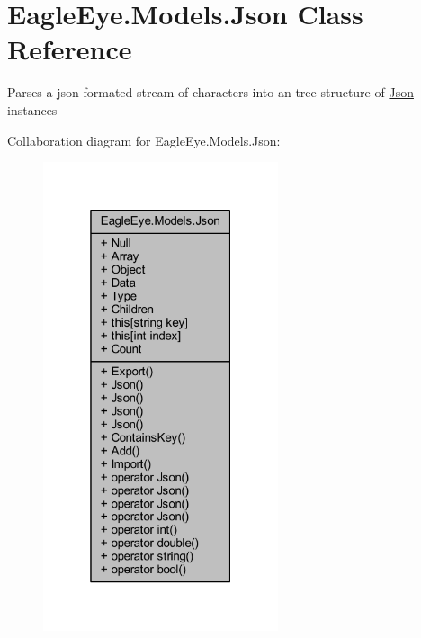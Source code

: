 \hypertarget{class_eagle_eye_1_1_models_1_1_json}{}\section{Eagle\+Eye.\+Models.\+Json Class Reference}
\label{class_eagle_eye_1_1_models_1_1_json}


Parses a json formated stream of characters into an tree structure of \mbox{\hyperlink{class_eagle_eye_1_1_models_1_1_json}{Json}} instances  




Collaboration diagram for Eagle\+Eye.\+Models.\+Json\+:\nopagebreak
\begin{figure}[H]
\begin{center}
\leavevmode
\includegraphics[width=196pt]{class_eagle_eye_1_1_models_1_1_json__coll__graph}
\end{center}
\end{figure}

